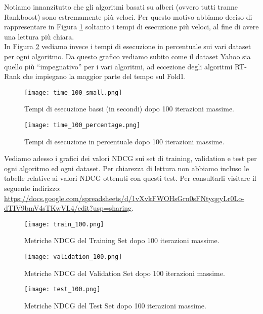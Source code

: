	Notiamo innanzitutto che gli algoritmi basati su alberi (ovvero tutti tranne Rankboost) sono estremamente più veloci. Per questo motivo abbiamo deciso di rappresentare in Figura \ref{fig:time_100_small} soltanto i tempi di esecuzione più veloci, al fine di avere una lettura più chiara.\\
	In Figura \ref{fig:time_100_percentage} vediamo invece i tempi di esecuzione in percentuale sui vari dataset per ogni algoritmo. Da questo grafico vediamo subito come il dataset Yahoo sia quello più ``impegnativo'' per i vari algoritmi, ad eccezione degli algoritmi RT-Rank che impiegano la maggior parte del tempo sul Fold1.\\
	
	\begin{figure}[!h]
		\centering
		\texttt{[image: time\_100\_small.png]}
		\caption{Tempi di esecuzione bassi (in secondi) dopo 100 iterazioni massime.}
		\label{fig:time_100_small}
	\end{figure}
	
	\begin{figure}[!h]
		\centering
		\texttt{[image: time\_100\_percentage.png]}
		\caption{Tempi di esecuzione in percentuale dopo 100 iterazioni massime.}
		\label{fig:time_100_percentage}
	\end{figure}
	
	Vediamo adesso i grafici dei valori NDCG sui set di training, validation e test per ogni algoritmo ed ogni dataset. Per chiarezza di lettura non abbiamo incluso le tabelle relative ai valori NDCG ottenuti con questi test. Per consultarli visitare il seguente indirizzo: \url{https://docs.google.com/spreadsheets/d/1vXvkFWOHsGrn0sFNtyqgyLr0Lo-dTIV9bmV4sTKwVL4/edit?usp=sharing}.\\
		
	\begin{figure}[!h]
		\centering
		\texttt{[image: train\_100.png]}
		\caption{Metriche NDCG del Training Set dopo 100 iterazioni massime.}
		\label{fig:train_100}
	\end{figure}
		
	\begin{figure}[!h]
		\centering
		\texttt{[image: validation\_100.png]}
		\caption{Metriche NDCG del Validation Set dopo 100 iterazioni massime.}
		\label{fig:vali_100}
	\end{figure}
			
	\begin{figure}[!h]
		\centering
		\texttt{[image: test\_100.png]}
		\caption{Metriche NDCG del Test Set dopo 100 iterazioni massime.}
		\label{fig:test_100}
	\end{figure}
	
